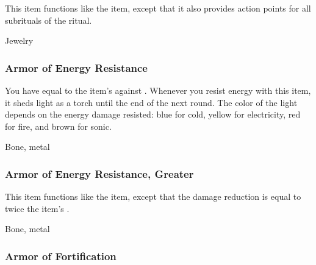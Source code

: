 This item functions like the  item, except that it also provides action points for all subrituals of the  ritual.



 


 Jewelry


\lowercase{\hypertarget{item:Armor of Energy Resistance}{}}\label{item:Armor of Energy Resistance}
\hypertarget{item:Armor of Energy Resistance}{\subsubsection{Armor of Energy Resistance\hfill{}}}

You have  equal to the item's  against .
Whenever you resist energy with this item, it sheds light as a torch until the end of the next round.
The color of the light depends on the energy damage resisted: blue for cold, yellow for electricity, red for fire, and brown for sonic.



 


 Bone, metal


\lowercase{\hypertarget{item:Armor of Energy Resistance, Greater}{}}\label{item:Armor of Energy Resistance, Greater}
\hypertarget{item:Armor of Energy Resistance, Greater}{\subsubsection{Armor of Energy Resistance, Greater\hfill{}}}

This item functions like the  item, except that the damage reduction is equal to twice the item's .



 


 Bone, metal


\lowercase{\hypertarget{item:Armor of Fortification}{}}\label{item:Armor of Fortification}
\hypertarget{item:Armor of Fortification}{\subsubsection{Armor of Fortification\hfill{}}}

